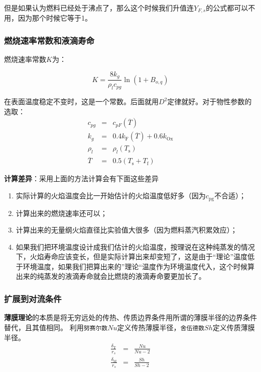 但是如果认为燃料已经处于沸点了，那么这个时候我们升值连\(Y_{F,s}\)的公式都可以不用，因为那个时候它等于1。

\subsubsection{燃烧速率常数和液滴寿命}

燃烧速率常数\(K\)为：

\begin{equation}
    K = \frac{8 k_g}{\rho_l c_{pg}}\ln(1+B_{o,q})
\end{equation}

在表面温度稳定不变时，这是一个常数。后面就用\(D^2\)定律就好。对于物性参数的选取：
\begin{eqnarray}
    c_{pg} &=& c_{pF} (\overline{T})\\
    k_g &=& 0.4 k_\mathrm{F}(\overline{T}) + 0.6 k_\mathrm{Ox}\\
    \rho_l&=& \rho_l(T_\mathrm{s})\\
    \overline{T} &=& 0.5(T_\mathrm{s}+T_\mathrm{f})
\end{eqnarray}

\textbf{计算差异}：采用上面的方法计算会有下面这些差异
\begin{enumerate}
    \item 实际计算的火焰温度会比一开始估计的火焰温度低好多（因为\(c_\mathrm{pg}\)不合适）；
    \item 计算出来的燃烧速率还可以；
    \item 计算出来的无量纲火焰直径比实验值大很多（因为燃料蒸汽积累效应）；
    \item 如果我们把环境温度设计成我们估计的火焰温度，按理说在这种纯蒸发的情况下，火焰寿命应该变长，但是实际计算出来却变短了，这是由于“理论”温度低于环境温度，如果我们把算出来的”理论“温度作为环境温度代入，这个时候算出来的纯蒸发的液滴寿命就会比燃烧的液滴寿命要更加长了。
\end{enumerate}

\subsubsection{扩展到对流条件}
\textbf{薄膜理论}的本质是将无穷远处的传热、传质边界条件用所谓的薄膜半径的边界条件替代，且其值相同。
利用\texttt{努赛尔数}\(Nu\)定义传热薄膜半径，\texttt{舍伍德数}\(Sh\)定义传质薄膜半径。
\begin{eqnarray}
    \frac{\delta_\mathrm{T}}{r_s} &=& \frac{Nu}{Nu - 2}\\
    \frac{\delta_\mathrm{M}}{r_s} &=& \frac{Sh}{Sh - 2}
\end{eqnarray}

